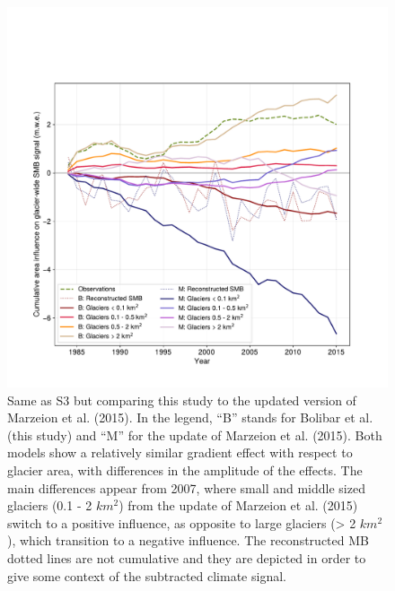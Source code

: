 \begin{figure}[h]
\centering
\includegraphics[width=14cm]{Figures/past/Figure_S4.pdf}
\captionsetup{justification=centering}
\caption{Same as S3 but comparing this study to the updated version of Marzeion et al. (2015). In the legend, “B” stands for Bolibar et al. (this study) and “M” for the update of Marzeion et al. (2015). Both models show a relatively similar gradient effect with respect to glacier area, with differences in the amplitude of the effects. The main differences appear from 2007, where small and middle sized glaciers (0.1 - 2 $km^{2}$) from the update of Marzeion et al. (2015) switch to a positive influence, as opposite to large glaciers (> 2 $km^{2}$), which transition to a negative influence. The reconstructed MB dotted lines are not cumulative and they are depicted in order to give some context of the subtracted climate signal.}
\label{past:figS4}
\end{figure}


